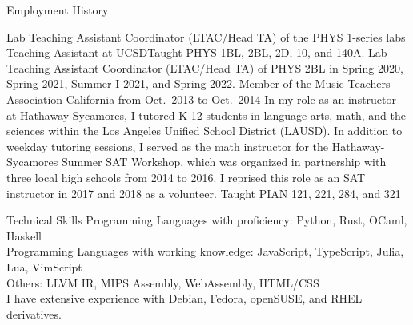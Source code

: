 \documentclass{cv}
\begin{document}
\begin{block}{Employment History}
  \begin{entries}
      {Lab Teaching Assistant Coordinator (LTAC/Head TA) of the PHYS 1-series
      labs}
      {Teaching Assistant at UCSD}{Taught PHYS 1BL, 2BL, 2D, 10, and 140A. Lab
      Teaching Assistant Coordinator (LTAC/Head TA) of PHYS 2BL in Spring 2020,
      Spring 2021, Summer I 2021, and Spring 2022.}
      {Member of the Music Teachers Association California from Oct.\ 2013 to Oct.\ 2014}
      {In my role as an instructor at Hathaway-Sycamores, I tutored K-12
      students in language arts, math, and the sciences within the Los Angeles
      Unified School District (LAUSD). In addition to weekday tutoring sessions,
      I served as the math instructor for the Hathaway-Sycamores Summer SAT
      Workshop, which was organized in partnership with three local high schools
      from 2014 to 2016. I reprised this role as an SAT instructor in 2017 and
      2018 as a volunteer.}
      {Taught PIAN 121, 221, 284, and 321}
  \end{entries}
\end{block}

\begin{block}{Technical Skills}
  Programming Languages with proficiency: Python, Rust, OCaml, Haskell\\
  Programming Languages with working knowledge: JavaScript, TypeScript, Julia, Lua, VimScript\\
  Others: LLVM IR, MIPS Assembly, WebAssembly, HTML/CSS\\
  I have extensive experience with Debian, Fedora, openSUSE, and
  RHEL derivatives.
\end{block}

\begin{refsection}[papers]
  \nocite{*}
  \printbibliography[title=Publications]
\end{refsection}

\begin{refsection}[talks]
  \nocite{*}
  \printbibliography[title=Talks and Presentations]
\end{refsection}
\end{document}
